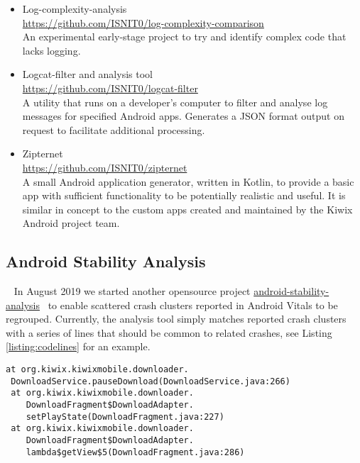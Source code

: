 \begin{itemize}
    \item Log-complexity-analysis\\ \url{https://github.com/ISNIT0/log-complexity-comparison}\\ An experimental early-stage project to try and identify complex code that lacks logging.
    \item Logcat-filter and analysis tool\\ \url{https://github.com/ISNIT0/logcat-filter}\\ A utility that runs on a developer's computer to filter and analyse log messages for specified Android apps. Generates a JSON format output on request to facilitate additional processing.
    
    
    \item Zipternet\\ \url{https://github.com/ISNIT0/zipternet}\\ A small Android application generator, written in Kotlin, to provide a basic app with sufficient functionality to be potentially realistic and useful. It is similar in concept to the custom apps created and maintained by the Kiwix Android project team.
\end{itemize}


\subsection{Android Stability Analysis}~\label{subsec:android-stability-analysis}
In August 2019 we started another opensource project \href{https://github.com/commercetest/android-stability-analysis}{android-stability-analysis}~\citep{android-stability-analysis} to enable scattered crash clusters reported in Android Vitals to be regrouped. Currently, the analysis tool simply matches reported crash clusters with a series of lines that should be common to related crashes, see Listing \ref{listing:codelines}  for an example.

\begin{lstlisting}[caption=Example of lines to match,label=listing:codelines]
at org.kiwix.kiwixmobile.downloader.
 DownloadService.pauseDownload(DownloadService.java:266)
 at org.kiwix.kiwixmobile.downloader.
    DownloadFragment$DownloadAdapter.
    setPlayState(DownloadFragment.java:227)
 at org.kiwix.kiwixmobile.downloader.
    DownloadFragment$DownloadAdapter.
    lambda$getView$5(DownloadFragment.java:286)
\end{lstlisting}


